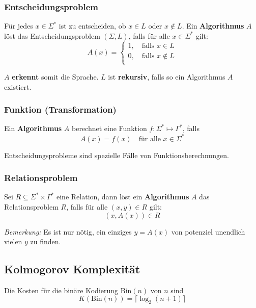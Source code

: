 \documentclass[11pt]{article}
\begin{document}
\subsubsection{Entscheidungsproblem}
F{\"u}r jedes $x \in \Sigma^*$ ist zu entscheiden, ob $x \in L$ oder $x \notin L$. Ein \textbf{Algorithmus} $A$ l{\"o}st das Entscheidungsproblem $(\Sigma, L)$, falls f{\"u}r alle $x \in \Sigma^*$ gilt:
\begin{equation*}
	A(x) = \begin{cases}
		1, \quad\text{falls $x \in L$} \\
		0, \quad\text{falls $x \notin L$} \\
	\end{cases}
\end{equation*}

$A$ \textbf{erkennt} somit die Sprache. $L$ ist \textbf{rekursiv}, falls so ein Algorithmus $A$ existiert.

\subsubsection{Funktion (Transformation)}
Ein \textbf{Algorithmus} $A$ berechnet eine Funktion $f: \Sigma^* \mapsto \Gamma^*$, falls
\begin{equation*}
	A(x) = f(x) \quad\text{f{\"u}r alle $x \in \Sigma^*$}
\end{equation*}

Entscheidungsprobleme sind spezielle F{\"a}lle von Funktionsberechnungen.

\subsubsection{Relationsproblem}
Sei $R \subseteq \Sigma^*\times\Gamma^*$ eine Relation, dann l{\"o}st ein \textbf{Algorithmus} $A$ das Relationsproblem $R$, falls f{\"u}r alle $(x,y) \in R$ gilt:
\begin{equation*}
	(x, A(x)) \in R
\end{equation*}

\emph{Bemerkung:} Es ist nur n{\"o}tig, ein einziges $y = A(x)$ von potenziel unendlich vielen $y$ zu finden.

\subsection{Kolmogorov Komplexit{\"a}t}

Die Kosten f{\"u}r die bin{\"a}re Kodierung $\text{Bin}(n)$ von $n$ sind
\begin{equation*}
	K(\text{Bin}(n)) = \lceil\log_2(n+1)\rceil
\end{equation*}
\end{document}
